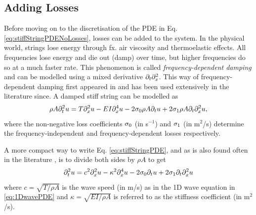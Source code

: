 

\subsection{Adding Losses}
Before moving on to the discretisation of the PDE in Eq. \eqref{eq:stiffStringPDENoLosses}, losses can be added to the system. In the physical world, strings lose energy through fx. air viscosity and thermoelastic effects. All frequencies lose energy and die out (damp) over time, but higher frequencies do so at a much faster rate. This phenomenon is called \textit{frequency-dependent damping} and can be modelled using a mixed derivative $\partial_t \partial_x^2$. This way of frequency-dependent damping first appeared in \cite{Bensa2003} and has been used extensively in the literature since. A damped stiff string can be modelled as
\begin{equation}\label{eq:stiffStringPDE}
    \rho A \partial_t^2 u = T \partial_x^2 u - EI \partial_x^4 u - 2 \sigma_{0} \rho A \partial_t u + 2 \sigma_{1} \rho A\partial_t \partial_x^2 u,
\end{equation}
where the non-negative loss coefficients $\sigma_{0}$ (in s$^{-1}$) and $\sigma_{1}$ (in m$^2$/s) determine the frequency-independent and frequency-dependent losses respectively. 

A more compact way to write Eq. \eqref{eq:stiffStringPDE}, and as is also found often in the literature \cite{theBible}, is to divide both sides by $\rho A$ to get
\begin{equation}\label{eq:stiffStringPDECompact}
    \partial_t^2 u = c^2 \partial_x^2 u - \kappa^2 \partial_x^4 u - 2 \sigma_{0} \partial_t u + 2 \sigma_{1} \partial_t \partial_x^2 u
\end{equation}
where $c=\sqrt{T/\rho A}$ is the wave speed  (in m/s) as in the 1D wave equation in \eqref{eq:1DwavePDE} and $\kappa = \sqrt{EI / \rho A}$ is referred to as the stiffness coefficient (in m$^2$/s).


